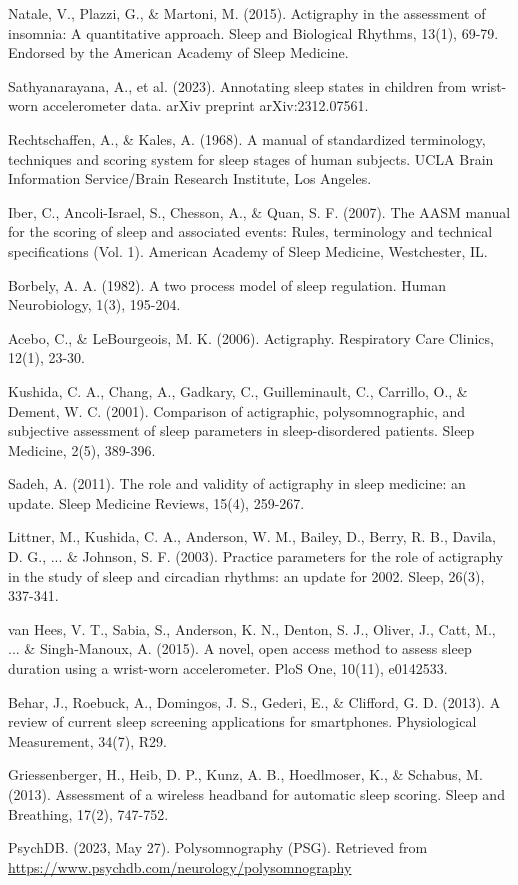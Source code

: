 \documentclass[conference]{IEEEtran}
\begin{document}
\begin{thebibliography}{1}
	Natale, V., Plazzi, G., \& Martoni, M. (2015). Actigraphy in the assessment of insomnia: A quantitative approach. Sleep and Biological Rhythms, 13(1), 69-79. Endorsed by the American Academy of Sleep Medicine.

	Sathyanarayana, A., et al. (2023). Annotating sleep states in children from wrist-worn accelerometer data. arXiv preprint arXiv:2312.07561.

	Rechtschaffen, A., \& Kales, A. (1968). A manual of standardized terminology, techniques and scoring system for sleep stages of human subjects. UCLA Brain Information Service/Brain Research Institute, Los Angeles.

	Iber, C., Ancoli-Israel, S., Chesson, A., \& Quan, S. F. (2007). The AASM manual for the scoring of sleep and associated events: Rules, terminology and technical specifications (Vol. 1). American Academy of Sleep Medicine, Westchester, IL.

	Borbely, A. A. (1982). A two process model of sleep regulation. Human Neurobiology, 1(3), 195-204.

	Acebo, C., \& LeBourgeois, M. K. (2006). Actigraphy. Respiratory Care Clinics, 12(1), 23-30.

	Kushida, C. A., Chang, A., Gadkary, C., Guilleminault, C., Carrillo, O., \& Dement, W. C. (2001). Comparison of actigraphic, polysomnographic, and subjective assessment of sleep parameters in sleep-disordered patients. Sleep Medicine, 2(5), 389-396.

	Sadeh, A. (2011). The role and validity of actigraphy in sleep medicine: an update. Sleep Medicine Reviews, 15(4), 259-267.

	Littner, M., Kushida, C. A., Anderson, W. M., Bailey, D., Berry, R. B., Davila, D. G., ... \& Johnson, S. F. (2003). Practice parameters for the role of actigraphy in the study of sleep and circadian rhythms: an update for 2002. Sleep, 26(3), 337-341.

	van Hees, V. T., Sabia, S., Anderson, K. N., Denton, S. J., Oliver, J., Catt, M., ... \& Singh-Manoux, A. (2015). A novel, open access method to assess sleep duration using a wrist-worn accelerometer. PloS One, 10(11), e0142533.

	Behar, J., Roebuck, A., Domingos, J. S., Gederi, E., \& Clifford, G. D. (2013). A review of current sleep screening applications for smartphones. Physiological Measurement, 34(7), R29.

	Griessenberger, H., Heib, D. P., Kunz, A. B., Hoedlmoser, K., \& Schabus, M. (2013). Assessment of a wireless headband for automatic sleep scoring. Sleep and Breathing, 17(2), 747-752.

	PsychDB. (2023, May 27). Polysomnography (PSG). Retrieved from \url{https://www.psychdb.com/neurology/polysomnography}

\end{thebibliography}
\end{document}
